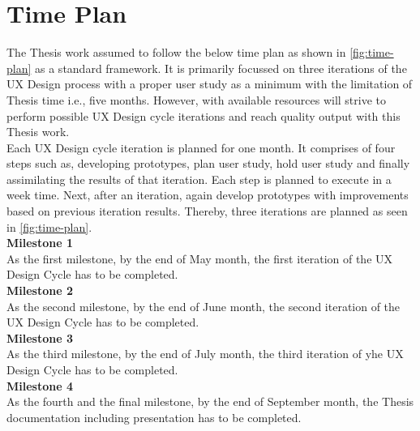 \chapter{Time Plan}
\label{ch:timeplan}

The Thesis work assumed to follow the below time plan as shown in \autoref{fig:time-plan} as a standard framework. It is primarily focussed on three iterations of the UX Design process with a proper user study as a minimum with the limitation of Thesis time i.e., five months. However, with available resources will strive to perform possible UX Design cycle iterations and reach quality output with this Thesis work. \\

Each UX Design cycle iteration is planned for one month. It comprises of four steps such as, developing prototypes, plan user study, hold user study and finally assimilating the results of that iteration. Each step is planned to execute in a week time. Next, after an iteration, again develop prototypes with improvements based on previous iteration results. Thereby, three iterations are planned as seen in  \autoref{fig:time-plan}. \\ 

\textbf{Milestone 1} \\

As the first milestone, by the end of May month, the first iteration of the UX Design Cycle has to be completed. \\ 

\textbf{Milestone 2} \\

As the second milestone, by the end of June month, the second iteration of the UX Design Cycle has to be completed. \\ 

\textbf{Milestone 3} \\

As the third milestone, by the end of July month, the third iteration of yhe UX Design Cycle has to be completed. \\

\textbf{Milestone 4} \\

As the fourth and the final milestone, by the end of September month, the Thesis documentation including presentation has to be completed. \\

